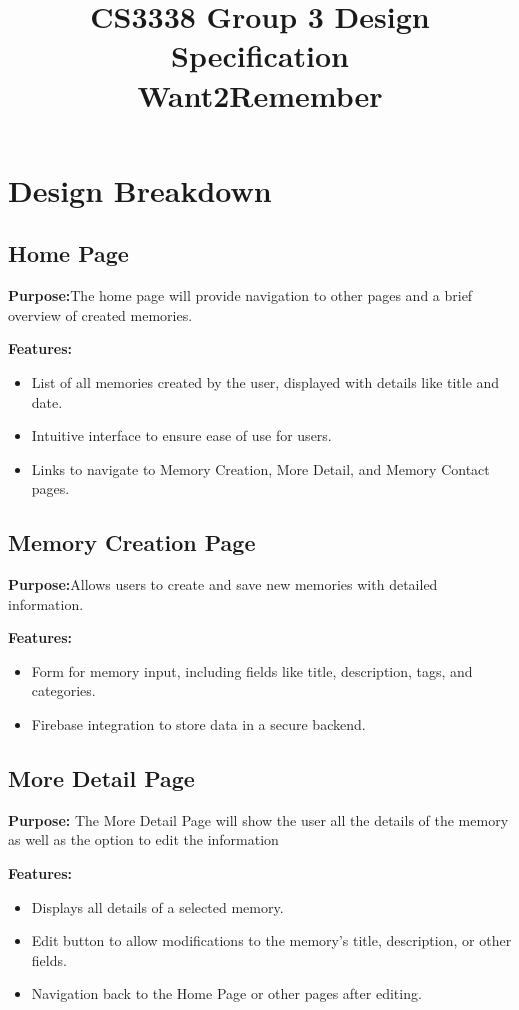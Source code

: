 \documentclass[12pt]{article}
\title{CS3338 Group 3 Design Specification\\\textbf{Want2Remember}}
\author{}
\date{}
\begin{document}
\maketitle
\thispagestyle{empty}
\newpage

\tableofcontents
\newpage

\section{Design Breakdown}

\subsection{Home Page}
\textbf{Purpose:}The home page will provide navigation to other pages and a brief overview of created memories.

\textbf{Features:}
\begin{itemize}
    \item List of all memories created by the user, displayed with details like title and date.
    \item Intuitive interface to ensure ease of use for users.
    \item Links to navigate to Memory Creation, More Detail, and Memory Contact pages.
\end{itemize}

\subsection{Memory Creation Page}
\textbf{Purpose:}Allows users to create and save new memories with detailed information.

\textbf{Features:}
\begin{itemize}
    \item Form for memory input, including fields like title, description, tags, and categories.
    \item Firebase integration to store data in a secure backend.
\end{itemize}

\subsection{More Detail Page}
\textbf{Purpose:} The More Detail Page will show the user all the details of the memory as well as the option to edit the information

\textbf{Features:}
\begin{itemize}
    \item Displays all details of a selected memory.
    \item Edit button to allow modifications to the memory’s title, description, or other fields.
    \item Navigation back to the Home Page or other pages after editing.
\end{itemize}
\end{document}
